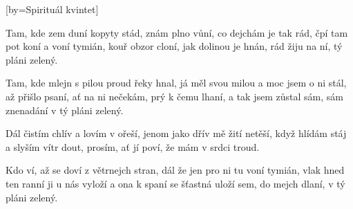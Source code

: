 [by={Spirituál kvintet}]

\beginverse{}
Tam, kde zem duní kopyty stád,
znám plno vůní, co dejchám je tak rád,
čpí tam pot koní a voní tymián,
kouř obzor cloní, jak dolinou je hnán,
rád žiju na ní, tý pláni zelený.
\endverse{}

\beginverse{}
Tam, kde mlejn s pilou proud řeky hnal,
já měl svou milou a moc jsem o ni stál,
až přišlo psaní, ať na ni nečekám,
prý k čemu lhaní, a tak jsem zůstal sám,
sám znenadání v tý pláni zelený.
\endverse{}

\beginchorus{}
Dál čistím chlív a lovím v ořeší,
jenom jako dřív mě žití netěší,
když hlídám stáj a slyším vítr dout,
prosím, ať jí poví, že mám v srdci troud.
\endchorus{}

\beginverse{}
Kdo ví, až se doví z větrnejch stran,
dál že jen pro ni tu voní tymián,
vlak hned ten ranní ji u nás vyloží
a ona k spaní se šťastná uloží
sem, do mejch dlaní, v tý pláni zelený.
\endverse{}

\endsong{}
